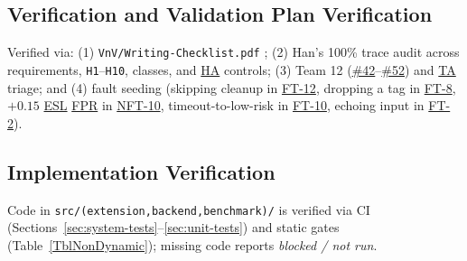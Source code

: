 \documentclass[12pt, titlepage]{article}
\newcommand{\ESL}{\hyperlink{vnv-acr-esl}{ESL}}
\newcommand{\FPR}{\hyperlink{vnv-acr-fpr}{FPR}}
\newcommand{\HA}{\hyperlink{vnv-acr-ha}{HA}}
\newcommand{\TA}{\hyperlink{vnv-acr-ta}{TA}}
\begin{document}
\subsection{Verification and Validation Plan Verification}\label{subsec:vnv-verif}

Verified via: (1) \texttt{VnV/\allowbreak{}Writing-\allowbreak{}Checklist.pdf} \cite{SmithCapTemplate}; (2) Han's 100\% trace audit across requirements, \texttt{H1}--\texttt{H10}, classes, and \HA{} controls; (3) Team 12 (\href{https://github.com/richy1337/Verity/issues/42}{\#42}--\href{https://github.com/richy1337/Verity/issues/52}{\#52}) and \TA{} triage; and (4) fault seeding (skipping cleanup in \hyperref[test:FT-12]{FT-12}, dropping a tag in \hyperref[test:FT-8]{FT-8}, $+0.15$ \ESL{} \FPR{} in \hyperref[test:NFT-10]{NFT-10}, timeout-to-low-risk in \hyperref[test:FT-10]{FT-10}, echoing input in \hyperref[test:FT-2]{FT-2}).

\subsection{Implementation Verification}\label{subsec:impl-verif}

Code in \texttt{src/\allowbreak{}(extension,backend,benchmark)/} is verified via CI (Sections~\ref{sec:system-tests}--\ref{sec:unit-tests}) and static gates (Table~\ref{TblNonDynamic}); missing code reports \emph{blocked / not run}.
\end{document}
